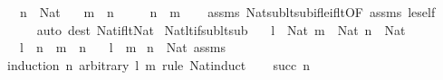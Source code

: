 \begin{isabellebody}
\ \ \ {\isachardoublequoteopen}n\ {\isacharcolon}{\kern0pt}\ Nat{\isachardoublequoteclose}\isanewline
\ \ \ {\isachardoublequoteopen}m\ {\isacharless}{\kern0pt}\ n{\isachardoublequoteclose}\isanewline
\ \ \ {\isachardoublequoteopen}{}\ {\isacharless}{\kern0pt}\ n\ {\isacharminus}{\kern0pt}\ m{\isachardoublequoteclose}\isanewline
%
\isadelimproof
\ \ %
\endisadelimproof
%
\isatagproof
{}\isamarkupfalse%
\ assms\ Nat{\isacharunderscore}{\kern0pt}sub{\isacharunderscore}{\kern0pt}lt{\isacharunderscore}{\kern0pt}sub{\isacharunderscore}{\kern0pt}if{\isacharunderscore}{\kern0pt}le{\isacharunderscore}{\kern0pt}if{\isacharunderscore}{\kern0pt}lt{\isacharbrackleft}{\kern0pt}OF\ assms\ le{\isacharunderscore}{\kern0pt}self{\isacharbrackright}{\kern0pt}\isanewline
\ \ \ \ \isamarkupfalse%
\ {\isacharparenleft}{\kern0pt}auto\ dest{\isacharcolon}{\kern0pt}\ Nat{\isacharunderscore}{\kern0pt}if{\isacharunderscore}{\kern0pt}lt{\isacharunderscore}{\kern0pt}Nat{\isacharparenright}{\kern0pt}%
\endisatagproof
{\isafoldproof}%
%
\isadelimproof
\isanewline
%
\endisadelimproof
\isanewline
{}\isamarkupfalse%
\ Nat{\isacharunderscore}{\kern0pt}lt{\isacharunderscore}{\kern0pt}if{\isacharunderscore}{\kern0pt}sub{\isacharunderscore}{\kern0pt}lt{\isacharunderscore}{\kern0pt}sub{\isacharcolon}{\kern0pt}\isanewline
\ \ \ {\isachardoublequoteopen}l\ {\isacharcolon}{\kern0pt}\ Nat{\isachardoublequoteclose}\ {\isachardoublequoteopen}m\ {\isacharcolon}{\kern0pt}\ Nat{\isachardoublequoteclose}\ {\isachardoublequoteopen}n\ {\isacharcolon}{\kern0pt}\ Nat{\isachardoublequoteclose}\isanewline
\ \ \ {\isachardoublequoteopen}l\ {\isacharminus}{\kern0pt}\ n\ {\isacharless}{\kern0pt}\ m\ {\isacharminus}{\kern0pt}\ n{\isachardoublequoteclose}\isanewline
\ \ \ {\isachardoublequoteopen}l\ {\isacharless}{\kern0pt}\ m{\isachardoublequoteclose}\isanewline
%
\isadelimproof
%
\endisadelimproof
%
\isatagproof
{}\isamarkupfalse%
\ {\isacartoucheopen}n\ {\isacharcolon}{\kern0pt}\ Nat{\isacartoucheclose}\ assms\isanewline
{}\isamarkupfalse%
\ {\isacharparenleft}{\kern0pt}induction\ n\ arbitrary{\isacharcolon}{\kern0pt}\ l\ m\ rule{\isacharcolon}{\kern0pt}\ Nat{\isacharunderscore}{\kern0pt}induct{\isacharparenright}{\kern0pt}\isanewline
\ \ \isamarkupfalse%
\ {\isacharparenleft}{\kern0pt}succ\ n{\isacharparenright}{\kern0pt}\isanewline
\ \ \isamarkupfalse%
\ \isamarkupfalse%

\end{isabellebody}
